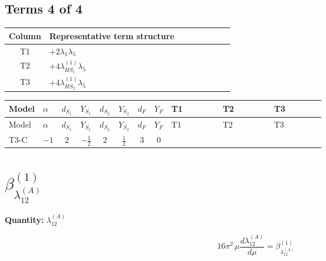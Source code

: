 \documentclass[8pt]{article}
\begin{document}
\begin{landscape}
\subsection*{Terms 4 of 4}
\begin{center}
\begin{tabular}{@{}c >{\raggedright\arraybackslash}p{0.82\linewidth}@{}}
\toprule
Column & Representative term structure \\
\midrule
T1 & \(\displaystyle +2 {\lambda_1} {\lambda_5}\) \\
\midrule
T2 & \(\displaystyle +4 {\lambda_{HS_1}^{(1)}} {\lambda_5}\) \\
\midrule
T3 & \(\displaystyle +4 {\lambda_{HS_2}^{(1)}} {\lambda_5}\) \\
\midrule
\bottomrule
\end{tabular}
\end{center}
\smallskip
\tiny
\begin{longtable}{@{}llcccccc >{\raggedright\arraybackslash}p{0.21\linewidth} >{\raggedright\arraybackslash}p{0.21\linewidth} >{\raggedright\arraybackslash}p{0.21\linewidth}@{}}
\toprule
Model & $\alpha$ & $d_{S_1}$ & $Y_{S_1}$ & $d_{S_2}$ & $Y_{S_2}$ & $d_F$ & $Y_F$ & T1 & T2 & T3 \\
\midrule
\endfirsthead
\toprule
Model & $\alpha$ & $d_{S_1}$ & $Y_{S_1}$ & $d_{S_2}$ & $Y_{S_2}$ & $d_F$ & $Y_F$ & T1 & T2 & T3 \\
\midrule
\endhead
T3-C & $-1$ & $2$ & $-\frac{1}{2}$ & $2$ & $\frac{1}{2}$ & $3$ & $0$ & \scriptsize\adjustbox{max width=\linewidth}{$\begin{gathered} +2 {\lambda_1} {\lambda_5}\end{gathered}$} & \scriptsize\adjustbox{max width=\linewidth}{$\begin{gathered} +4 {\lambda_{HS_1}^{(1)}} {\lambda_5}\end{gathered}$} & \scriptsize\adjustbox{max width=\linewidth}{$\begin{gathered} +4 {\lambda_{HS_2}^{(1)}} {\lambda_5}\end{gathered}$} \\
\midrule
\bottomrule
\end{longtable}
\clearpage
\section*{$\beta_{\lambda_{12}^{(A)}}^{(1)}$}
\noindent\textbf{Quantity: }$\lambda_{12}^{(A)}$\par\smallskip
\[16\pi^2\,\mu\frac{d \lambda_{12}^{(A)}}{d\mu}=\beta_{\lambda_{12}^{(A)}}^{(1)}\]

\end{landscape}
\end{document}

